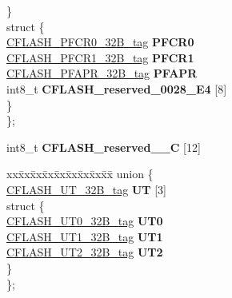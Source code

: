 \begin{DoxyCompactItemize}
\begin{tabbing}
\>\} \\
\mbox{\label{unionCFLASH__struct__tag_1_1_0D1501_ae3ef824cb09b9ddbd2e2f7c836d37ac7}} 
\>struct \{\\
\>\>\mbox{\hyperlink{unionCFLASH__PFCR0__32B__tag}{CFLASH\_PFCR0\_32B\_tag}} {\bfseries PFCR0}\\
\>\>\mbox{\hyperlink{unionCFLASH__PFCR1__32B__tag}{CFLASH\_PFCR1\_32B\_tag}} {\bfseries PFCR1}\\
\>\>\mbox{\hyperlink{unionCFLASH__PFAPR__32B__tag}{CFLASH\_PFAPR\_32B\_tag}} {\bfseries PFAPR}\\
\>\>int8\_t {\bfseries CFLASH\_reserved\_0028\_E4} \mbox{[}8\mbox{]}\\
\>\} \\
\}; \\

\end{tabbing}\item 
\mbox{\label{structCFLASH__struct__tag_ab2c680cb7da2dff3a34e10f68d7cb9e9}} 
int8\+\_\+t {\bfseries C\+F\+L\+A\+S\+H\+\_\+reserved\+\_\+\_\+C} \mbox{[}12\mbox{]}
\item 
\mbox{\label{structCFLASH__struct__tag_ab6395b1e121d604ae65459d26220287d}} 
\begin{tabbing}
xx\=xx\=xx\=xx\=xx\=xx\=xx\=xx\=xx\=\kill
union \{\\
\>\mbox{\hyperlink{unionCFLASH__UT__32B__tag}{CFLASH\_UT\_32B\_tag}} {\bfseries UT} \mbox{[}3\mbox{]}\\
\mbox{\label{unionCFLASH__struct__tag_1_1_0D1503_ae862ed7fdd3ca2706ae8183fc21eedb0}} 
\>struct \{\\
\>\>\mbox{\hyperlink{unionCFLASH__UT0__32B__tag}{CFLASH\_UT0\_32B\_tag}} {\bfseries UT0}\\
\>\>\mbox{\hyperlink{unionCFLASH__UT1__32B__tag}{CFLASH\_UT1\_32B\_tag}} {\bfseries UT1}\\
\>\>\mbox{\hyperlink{unionCFLASH__UT2__32B__tag}{CFLASH\_UT2\_32B\_tag}} {\bfseries UT2}\\
\>\} \\
\}; \\


\end{tabbing}
\end{DoxyCompactItemize}
